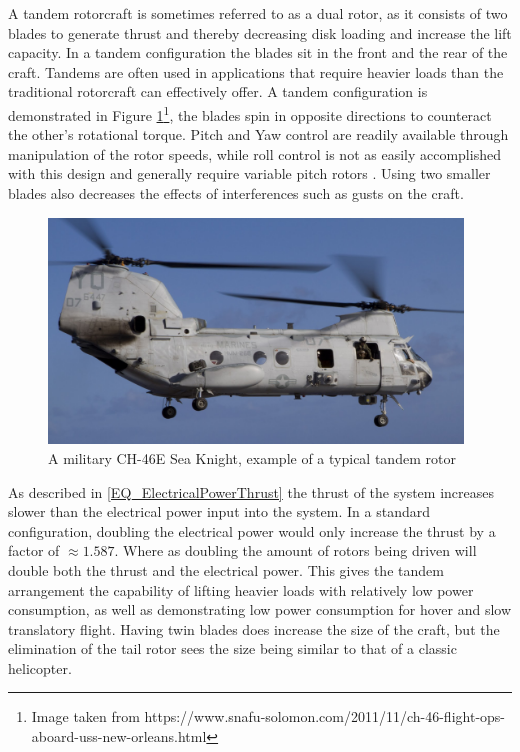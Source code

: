 A tandem rotorcraft is sometimes referred to as a dual rotor, as it consists of two blades to generate thrust and thereby decreasing disk loading and increase the lift capacity. In a tandem configuration the blades sit in the front and the rear of the craft. Tandems are often used in applications that require heavier loads than the traditional rotorcraft can effectively offer. A tandem configuration is demonstrated in Figure \ref{IM_Tandem}\footnote{Image taken from https://www.snafu-solomon.com/2011/11/ch-46-flight-ops-aboard-uss-new-orleans.html}, the blades spin in opposite directions to counteract the other's rotational torque. Pitch and Yaw control are readily available through manipulation of the rotor speeds, while roll control is not as easily accomplished with this design and generally require variable pitch rotors \cite{Oh2005}. Using two smaller blades also decreases the effects of interferences such as gusts on the craft. 

\begin{figure}[H]
	\centering
	\includegraphics[height = 6cm]{Images/Literature/Tandem}     
	\caption{A military CH-46E Sea Knight, example of a typical tandem rotor}
	\label{IM_Tandem}
\end{figure}


As described in \eqref{EQ_ElectricalPowerThrust} the thrust of the system increases slower than the electrical power input into the system. In a standard configuration, doubling the electrical power would only increase the thrust by a factor of $\approx 1.587$. Where as doubling the amount of rotors being driven will double both the thrust and the electrical power. This gives the tandem arrangement the capability of lifting heavier loads with relatively low power consumption, as well as demonstrating low power consumption for hover and slow translatory flight. Having twin blades does increase the size of the craft, but the elimination of the tail rotor sees the size being similar to that of a classic helicopter.


